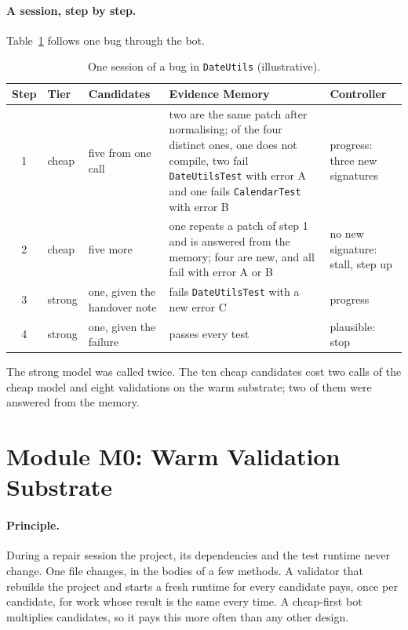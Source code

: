 \paragraph{A session, step by step.} Table~\ref{tab:sys-walk} follows one bug
through the bot.

\begin{table}[htbp]
\centering
\caption{One session of a bug in \texttt{DateUtils} (illustrative).}
\label{tab:sys-walk}
\footnotesize
\begin{tabularx}{\textwidth}{@{}c >{\raggedright\arraybackslash}p{} >{\raggedright\arraybackslash}p{} >{\raggedright\arraybackslash}X >{\raggedright\arraybackslash}p{}@{}}
\toprule
Step & Tier & Candidates & Evidence Memory & Controller\\
\midrule
1 & cheap & five from one call & two are the same patch after normalising; of the four distinct ones, one does not compile, two fail \texttt{DateUtilsTest} with error A and one fails \texttt{CalendarTest} with error B & progress: three new signatures\\
2 & cheap & five more & one repeats a patch of step 1 and is answered from the memory; four are new, and all fail with error A or B & no new signature: stall, step up\\
3 & strong & one, given the handover note & fails \texttt{DateUtilsTest} with a new error C & progress\\
4 & strong & one, given the failure & passes every test & plausible: stop\\
\bottomrule
\end{tabularx}
\end{table}

The strong model was called twice. The ten cheap candidates cost two calls of
the cheap model and eight validations on the warm substrate; two of them were
answered from the memory.

\section{Module M0: Warm Validation Substrate}
\label{sec:sys-warm}

\paragraph{Principle.} During a repair session the project, its dependencies
and the test runtime never change. One file changes, in the bodies of a few
methods. A validator that rebuilds the project and starts a fresh runtime for
every candidate pays, once per candidate, for work whose result is the same
every time. A cheap-first bot multiplies candidates, so it pays this more
often than any other design.

